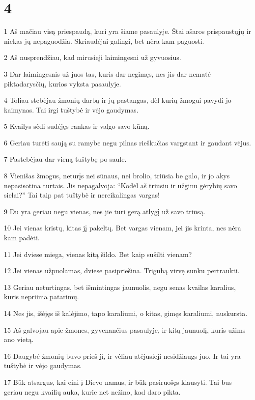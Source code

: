 \chapter{4}


\par 1 Aš mačiau visą priespaudą, kuri yra šiame pasaulyje. Štai ašaros prispaustųjų ir niekas jų nepaguodžia. Skriaudėjai galingi, bet nėra kam paguosti. 
\par 2 Aš nusprendžiau, kad mirusieji laimingesni už gyvuosius. 
\par 3 Dar laimingesnis už juos tas, kuris dar negimęs, nes jis dar nematė piktadarysčių, kurios vyksta pasaulyje. 
\par 4 Toliau stebėjau žmonių darbą ir jų pastangas, dėl kurių žmogui pavydi jo kaimynas. Tai irgi tuštybė ir vėjo gaudymas. 
\par 5 Kvailys sėdi sudėjęs rankas ir valgo savo kūną. 
\par 6 Geriau turėti saują su ramybe negu pilnas rieškučias vargstant ir gaudant vėjus. 
\par 7 Pastebėjau dar vieną tuštybę po saule. 
\par 8 Vienišas žmogus, neturįs nei sūnaus, nei brolio, triūsia be galo, ir jo akys nepasisotina turtais. Jis nepagalvoja: “Kodėl aš triūsiu ir užginu gėrybių savo sielai?” Tai taip pat tuštybė ir nereikalingas vargas! 
\par 9 Du yra geriau negu vienas, nes jie turi gerą atlygį už savo triūsą. 
\par 10 Jei vienas kristų, kitas jį pakeltų. Bet vargas vienam, jei jis krinta, nes nėra kam padėti. 
\par 11 Jei dviese miega, vienas kitą šildo. Bet kaip sušilti vienam? 
\par 12 Jei vienas užpuolamas, dviese pasipriešina. Trigubą virvę sunku pertraukti. 
\par 13 Geriau neturtingas, bet išmintingas jaunuolis, negu senas kvailas karalius, kuris nepriima patarimų. 
\par 14 Nes jis, išėjęs iš kalėjimo, tapo karaliumi, o kitas, gimęs karaliumi, nuskursta. 
\par 15 Aš galvojau apie žmones, gyvenančius pasaulyje, ir kitą jaunuolį, kuris užims ano vietą. 
\par 16 Daugybė žmonių buvo prieš jį, ir vėliau atėjusieji nesidžiaugs juo. Ir tai yra tuštybė ir vėjo gaudymas. 
\par 17 Būk atsargus, kai eini į Dievo namus, ir būk pasiruošęs klausyti. Tai bus geriau negu kvailių auka, kurie net nežino, kad daro pikta.



